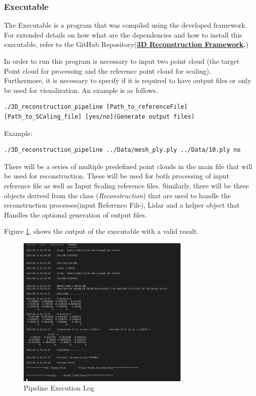 \documentclass[12pt]{report}
\begin{document}
\newpage
\subsubsection{Executable}
The Executable is a program that was compiled using the developed framework. For extended details on how what are the dependencies and how to install this executable, 
refer to the GitHub Repository(\textbf{\href{https://github.com/esteban-andrade/3D-Reconstructrion-Scanner} {3D Reconstruction Framework}.})

In order to run this program is necessary to input two point cloud (the target Point cloud for processing and the reference point cloud for scaling). 
Furthermore, it is necessary to specify if it is required to have output files or only be used for visualization.
An example is as follows.

\scriptsize\begin{verbatim} 
./3D_reconstruction_pipeline [Path_to_referenceFile] [Path_to_SCaling_file] [yes/no](Generate output files)
\end{verbatim}
\normalsize

Example:

\small\begin{verbatim} 
./3D_reconstruction_pipeline ../Data/mesh_ply.ply ../Data/10.ply no
\end{verbatim}
\normalsize

There will be a series of multiple predefined point clouds in the main file that will be used for reconstruction. These will be used for both processing of input reference file as well as Input Scaling reference files. 
Similarly, there will be three objects derived from the class (\textit{Reconstruction}) that are used to handle the reconstruction processes(input Reference File), Lidar and a helper object that Handles the optional generation of output files. 

Figure \ref{fig:pipeline_log}, shows the output of the executable with a valid result.
\enlargethispage{\baselineskip}
\begin{figure}[H]%
  \centering
 \includegraphics[width=0.75\textwidth]{log.png}
\caption{Pipeline Execution Log}
\label{fig:pipeline_log} 
\end{figure}
\end{document}
